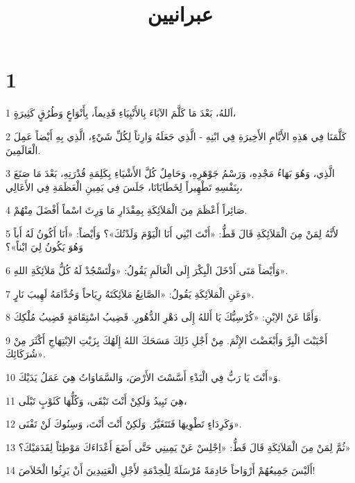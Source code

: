 

\title{عبرانيين}


\chapter{1}

\par 1 اَللهُ، بَعْدَ مَا كَلَّمَ الآبَاءَ بِالأَنْبِيَاءِ قَدِيماً، بِأَنْوَاعٍ وَطُرُقٍ كَثِيرَةٍ،
\par 2 كَلَّمَنَا فِي هَذِهِ الأَيَّامِ الأَخِيرَةِ فِي ابْنِهِ - الَّذِي جَعَلَهُ وَارِثاً لِكُلِّ شَيْءٍ، الَّذِي بِهِ أَيْضاً عَمِلَ الْعَالَمِينَ.
\par 3 الَّذِي، وَهُوَ بَهَاءُ مَجْدِهِ، وَرَسْمُ جَوْهَرِهِ، وَحَامِلٌ كُلَّ الأَشْيَاءِ بِكَلِمَةِ قُدْرَتِهِ، بَعْدَ مَا صَنَعَ بِنَفْسِهِ تَطْهِيراً لِخَطَايَانَا، جَلَسَ فِي يَمِينِ الْعَظَمَةِ فِي الأَعَالِي،
\par 4 صَائِراً أَعْظَمَ مِنَ الْمَلاَئِكَةِ بِمِقْدَارِ مَا وَرِثَ اسْماً أَفْضَلَ مِنْهُمْ.
\par 5 لأَنَّهُ لِمَنْ مِنَ الْمَلاَئِكَةِ قَالَ قَطُّ: «أَنْتَ ابْنِي أَنَا الْيَوْمَ وَلَدْتُكَ»؟ وَأَيْضاً: «أَنَا أَكُونُ لَهُ أَباً وَهُوَ يَكُونُ لِيَ ابْناً»؟
\par 6 وَأَيْضاً مَتَى أَدْخَلَ الْبِكْرَ إِلَى الْعَالَمِ يَقُولُ: «وَلْتَسْجُدْ لَهُ كُلُّ مَلاَئِكَةِ اللهِ».
\par 7 وَعَنِ الْمَلاَئِكَةِ يَقُولُ: «الصَّانِعُ مَلاَئِكَتَهُ رِيَاحاً وَخُدَّامَهُ لَهِيبَ نَارٍ».
\par 8 وَأَمَّا عَنْ الاِبْنِ: «كُرْسِيُّكَ يَا أَللهُ إِلَى دَهْرِ الدُّهُورِ. قَضِيبُ اسْتِقَامَةٍ قَضِيبُ مُلْكِكَ.
\par 9 أَحْبَبْتَ الْبِرَّ وَأَبْغَضْتَ الإِثْمَ. مِنْ أَجْلِ ذَلِكَ مَسَحَكَ اللهُ إِلَهُكَ بِزَيْتِ الاِبْتِهَاجِ أَكْثَرَ مِنْ شُرَكَائِكَ».
\par 10 وَ«أَنْتَ يَا رَبُّ فِي الْبَدْءِ أَسَّسْتَ الأَرْضَ، وَالسَّمَاوَاتُ هِيَ عَمَلُ يَدَيْكَ.
\par 11 هِيَ تَبِيدُ وَلَكِنْ أَنْتَ تَبْقَى، وَكُلُّهَا كَثَوْبٍ تَبْلَى،
\par 12 وَكَرِدَاءٍ تَطْوِيهَا فَتَتَغَيَّرُ. وَلَكِنْ أَنْتَ أَنْتَ، وَسِنُوكَ لَنْ تَفْنَى».
\par 13 ثُمَّ لِمَنْ مِنَ الْمَلاَئِكَةِ قَالَ قَطُّ: «اِجْلِسْ عَنْ يَمِينِي حَتَّى أَضَعَ أَعْدَاءَكَ مَوْطِئاً لِقَدَمَيْكَ؟»
\par 14 أَلَيْسَ جَمِيعُهُمْ أَرْوَاحاً خَادِمَةً مُرْسَلَةً لِلْخِدْمَةِ لأَجْلِ الْعَتِيدِينَ أَنْ يَرِثُوا الْخَلاَصَ!

